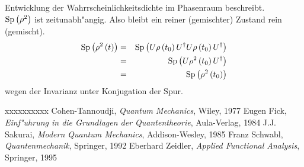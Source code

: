     Entwicklung der Wahrrscheinlichkeitsdichte im Phasenraum beschreibt. \\
    $\mbox{Sp} \left( \rho^2\right)$ ist zeitunabh"angig. Also bleibt ein reiner (gemischter) Zustand rein (gemischt).
    \begin{eqnarray*}
      \mbox{Sp} \left( \rho^2\left( t\right)\right) & = & \mbox{Sp} \left( U\rho\left( t_0 \right) U^{\dag} U\rho\left( t_0 \right) U^{\dag}\right) \\
                                   & = & \mbox{Sp} \left( U\rho^2\left( t_0\right) U^{\dag}\right) \\
                                   & = & \mbox{Sp} \left( \rho^2 \left( t_0\right)\right) 
    \end{eqnarray*}
    wegen der Invarianz unter Konjugation der Spur.

    \begin{thebibliography}{xxxxxxxxxx}
      Cohen-Tannoudji, {\em Quantum Mechanics}, Wiley, 1977
      Eugen Fick, {\em Einf"uhrung in die Grundlagen der Quantentheorie}, Aula-Verlag, 1984
      J.J. Sakurai, {\em Modern Quantum Mechanics}, Addison-Wesley, 1985
      Franz Schwabl, {\em Quantenmechanik}, Springer, 1992
      Eberhard Zeidler, {\em Applied Functional Analysis}, Springer, 1995
    \end{thebibliography}




 
